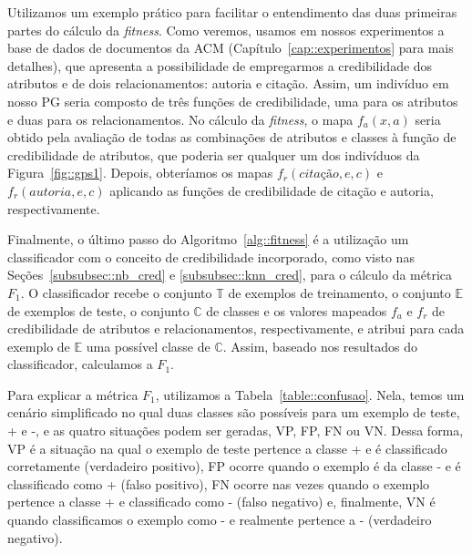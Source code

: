 Utilizamos um exemplo prático para facilitar o entendimento das duas primeiras partes do cálculo da \textit{fitness}. Como veremos, usamos em nossos experimentos a base de dados de documentos da \textsc{ACM} (Capítulo~\ref{cap::experimentos} para mais detalhes), que apresenta a possibilidade de empregarmos a credibilidade dos atributos e de dois relacionamentos: autoria e citação. Assim, um indivíduo em nosso \textsc{PG} seria composto de três funções de credibilidade, uma para os atributos e duas para os relacionamentos. No cálculo da \textit{fitness}, o mapa $f_a(x,a)$ seria obtido pela avaliação de todas as combinações de atributos e classes à função de credibilidade de atributos, que poderia ser qualquer um dos indivíduos da Figura~\ref{fig::gps1}. Depois, obteríamos os mapas $f_r(\textit{citação},e,c)$ e $f_r(autoria,e,c)$ aplicando as funções de credibilidade de citação e autoria, respectivamente.

Finalmente, o último passo do Algoritmo~\ref{alg::fitness} é a utilização um classificador com o conceito de credibilidade incorporado, como visto nas Seções~\ref{subsubsec::nb_cred} e \ref{subsubsec::knn_cred}, para o cálculo da métrica \textit{$F_1$}.
O classificador recebe o conjunto $\mathbb{T}$ de exemplos de treinamento, o conjunto $\mathbb{E}$ de exemplos de teste, o conjunto $\mathbb{C}$ de classes e os valores mapeados $f_a$ e $f_r$ de credibilidade de atributos e relacionamentos, respectivamente, e atribui para cada exemplo de $\mathbb{E}$ uma possível classe de $\mathbb{C}$.
Assim, baseado nos resultados do classificador, calculamos a \textit{$F_1$}.







Para explicar a métrica $F_1$, utilizamos a Tabela~\ref{table::confusao}. Nela, temos um cenário simplificado no qual duas classes são possíveis para um exemplo de teste, + e -, e as quatro situações podem ser geradas, VP, FP, FN ou VN. Dessa forma, VP é a situação na qual o exemplo de teste pertence a classe + e é classificado corretamente (verdadeiro positivo), FP ocorre quando o exemplo é da classe - e é classificado como + (falso positivo), FN ocorre nas vezes quando o exemplo pertence a classe + e classificado como - (falso negativo) e, finalmente, VN é quando classificamos o exemplo como - e realmente pertence a - (verdadeiro negativo).


